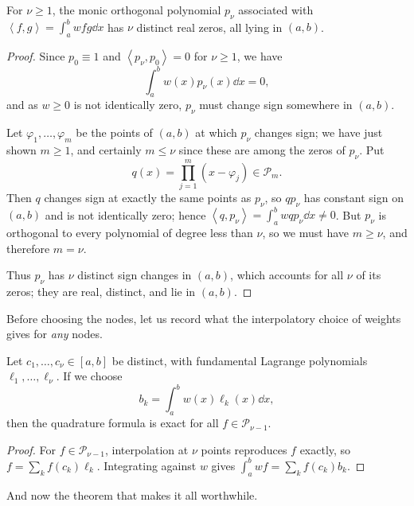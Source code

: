 \documentclass[a4paper]{scrartcl}
\newcommand{\ip}[2]{\left\langle #1, #2 \right\rangle}
\newcommand{\Pn}[1]{\mathcal{P}_{#1}}
\begin{document}
\begin{theorem}\label{thm:oproots}
  For $\nu \geq 1$, the monic orthogonal polynomial $p_\nu$ associated with $\ip{f}{g} = \int_a^b wfg\dd x$ has $\nu$ distinct real zeros, all lying in $(a,b)$.
\end{theorem}
\begin{proof}
  Since $p_0 \equiv 1$ and $\ip{p_\nu}{p_0} = 0$ for $\nu \geq 1$, we have
  $$
  \int_a^b w(x)p_\nu(x)\dd x = 0,
  $$
  and as $w \geq 0$ is not identically zero, $p_\nu$ must change sign somewhere in $(a,b)$.

  Let $\varphi_1, \dots, \varphi_m$ be the points of $(a,b)$ at which $p_\nu$ changes sign; we have just shown $m \geq 1$, and certainly $m \leq \nu$ since these are among the zeros of $p_\nu$. Put
  $$
  q(x) = \prod_{j=1}^{m}(x - \varphi_j) \in \Pn{m}.
  $$
  Then $q$ changes sign at exactly the same points as $p_\nu$, so $qp_\nu$ has constant sign on $(a,b)$ and is not identically zero; hence $\ip{q}{p_\nu} = \int_a^b w q p_\nu \dd x \neq 0$. But $p_\nu$ is orthogonal to every polynomial of degree less than $\nu$, so we must have $m \geq \nu$, and therefore $m = \nu$.

  Thus $p_\nu$ has $\nu$ distinct sign changes in $(a,b)$, which accounts for all $\nu$ of its zeros; they are real, distinct, and lie in $(a,b)$.
\end{proof}

Before choosing the nodes, let us record what the interpolatory choice of weights gives for \emph{any} nodes.

\begin{theorem}\label{thm:ordquad}
  Let $c_1, \dots, c_\nu \in [a,b]$ be distinct, with fundamental Lagrange polynomials $\ell_1, \dots, \ell_\nu$. If we choose
  $$
  b_k = \int_a^b w(x)\ell_k(x)\dd x,
  $$
  then the quadrature formula is exact for all $f \in \Pn{\nu - 1}$.
\end{theorem}
\begin{proof}
  For $f \in \Pn{\nu-1}$, interpolation at $\nu$ points reproduces $f$ exactly, so $f = \sum_k f(c_k)\ell_k$. Integrating against $w$ gives $\int_a^b wf = \sum_k f(c_k) b_k$.
\end{proof}

And now the theorem that makes it all worthwhile.
\end{document}

